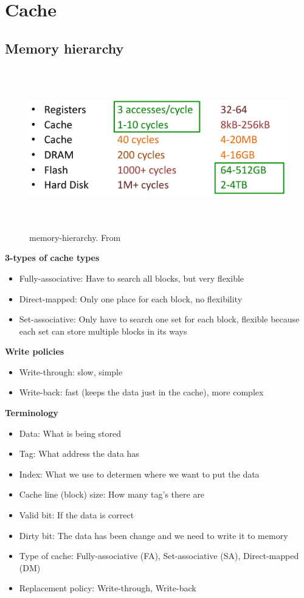 \newpage


\section{Cache}
\subsection{Memory hierarchy}

\begin{figure}[h]
    \vspace{10mm}
    \centering
    \includegraphics[width=16cm, height=7cm]{image/memory-hierarchy.png}
    \caption{memory-hierarchy. From \cite{}}
\end{figure}

\textbf{3-types of cache types}
\begin{itemize}
\item  Fully-associative: Have to search all blocks, but very flexible 
\item  Direct-mapped: Only one place for each block, no flexibility
\item  Set-associative: Only have to search one set for each block,
  flexible because each set can store multiple blocks in its ways 
\end{itemize}

\textbf{Write policies}
\begin{itemize}
\item  Write-through: slow, simple 
\item  Write-back: fast (keeps the data just in the cache), more complex
\end{itemize}

\textbf{Terminology}
\begin{itemize}
\item  Data: What is being stored
\item  Tag: What address the data has
\item  Index: What we use to determen where we want to put the data
\item  Cache line (block) size: How many tag's there are
\item  Valid bit: If the data is correct
\item  Dirty bit: The data has been change and we need to write it to memory
\item  Type of cache: Fully-associative (FA), Set-associative (SA), Direct-mapped (DM)
\item  Replacement policy: Write-through, Write-back  
\end{itemize}


